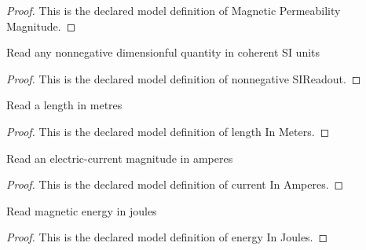 \begin{proof}
  This is the declared model definition of Magnetic Permeability Magnitude.
\end{proof}
\begin{definition}
  \label{def:physics:phyx-mini-0990:phyxminiproblems-problemphyxmini0990-nonnegativesireadout}
  Read any nonnegative dimensionful quantity in coherent SI units
\end{definition}
\begin{proof}
  This is the declared model definition of nonnegative SIReadout.
\end{proof}
\begin{definition}
  \label{def:physics:phyx-mini-0990:phyxminiproblems-problemphyxmini0990-lengthinmeters}
  Read a length in metres
\end{definition}
\begin{proof}
  This is the declared model definition of length In Meters.
\end{proof}
\begin{definition}
  \label{def:physics:phyx-mini-0990:phyxminiproblems-problemphyxmini0990-currentinamperes}
  Read an electric-current magnitude in amperes
\end{definition}
\begin{proof}
  This is the declared model definition of current In Amperes.
\end{proof}
\begin{definition}
  \label{def:physics:phyx-mini-0990:phyxminiproblems-problemphyxmini0990-energyinjoules}
  Read magnetic energy in joules
\end{definition}
\begin{proof}
  This is the declared model definition of energy In Joules.
\end{proof}
